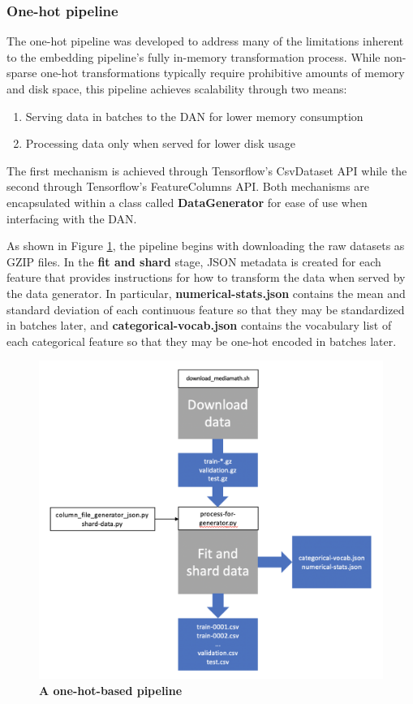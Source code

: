 \documentclass{proc}
\begin{document}
\subsubsection{One-hot pipeline}

The one-hot pipeline was developed to address many of the limitations inherent to the embedding pipeline's fully in-memory transformation process. While non-sparse one-hot transformations typically require prohibitive amounts of memory and disk space, this pipeline achieves scalability through two means:

\begin{enumerate}
\item{Serving data in batches to the DAN for lower memory consumption}
\item{Processing data only when served for lower disk usage}
\end{enumerate}

The first mechanism is achieved through Tensorflow's CsvDataset API while the second through Tensorflow's FeatureColumns API. Both mechanisms are encapsulated within a class called \textbf{DataGenerator} for ease of use when interfacing with the DAN.

As shown in Figure \ref{fig:generator-based-pipeline}, the pipeline begins with downloading the raw datasets as GZIP files. In the \textbf{fit and shard} stage, JSON metadata is created for each feature that provides instructions for how to transform the data when served by the data generator. In particular, \textbf{numerical-stats.json} contains the mean and standard deviation of each continuous feature so that they may be standardized in batches later, and \textbf{categorical-vocab.json} contains the vocabulary list of each categorical feature so that they may be one-hot encoded in batches later.

\begin{figure}[h!]
		\includegraphics*[scale=0.45]{../figures/generator-based-pipeline.png}
		\caption{\textbf{A one-hot-based pipeline}}
		\label{fig:generator-based-pipeline}
\end{figure}
\end{document}
